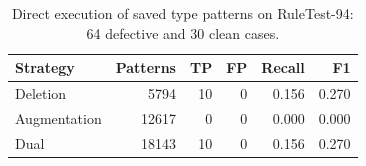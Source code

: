 \begin{table}[t]
\centering
\caption{Direct execution of saved type patterns on RuleTest-94: 64 defective and 30 clean cases.}
\label{tab:direct_execution}
\footnotesize
\setlength{\tabcolsep}{3pt}
\begin{tabular*}{\columnwidth}{@{\extracolsep{\fill}}lrrrrr@{}}
\toprule
Strategy & Patterns & TP & FP & Recall & F1 \\
\midrule
Deletion & 5794 & 10 & 0 & 0.156 & 0.270 \\
Augmentation & 12617 & 0 & 0 & 0.000 & 0.000 \\
Dual & 18143 & 10 & 0 & 0.156 & 0.270 \\
\bottomrule
\end{tabular*}
\end{table}
